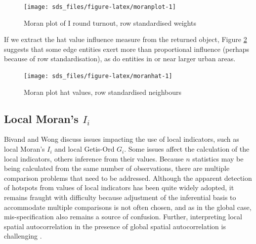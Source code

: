 \documentclass[]{book}
\newenvironment{Shaded}{\begin{snugshade}}{\end{snugshade}}
\newcommand{\KeywordTok}[1]{\textcolor[rgb]{0.13,0.29,0.53}{\textbf{#1}}}
\newcommand{\NormalTok}[1]{#1}
\newcommand{\OperatorTok}[1]{\textcolor[rgb]{0.81,0.36,0.00}{\textbf{#1}}}
\newcommand{\StringTok}[1]{\textcolor[rgb]{0.31,0.60,0.02}{#1}}
\begin{document}
\begin{figure}

{\centering \texttt{[image: sds\_files/figure-latex/moranplot-1]} 

}

\caption{Moran plot of I round turnout, row standardised weights}\label{fig:moranplot}
\end{figure}

If we extract the hat value influence measure from the returned object, Figure \ref{fig:moranhat} suggests that some edge entities exert more than proportional influence (perhaps because of row standardisation), as do entities in or near larger urban areas.



\begin{Shaded}
\end{Shaded}

\begin{figure}

{\centering \texttt{[image: sds\_files/figure-latex/moranhat-1]} 

}

\caption{Moran plot hat values, row standardised neighbours}\label{fig:moranhat}
\end{figure}

\hypertarget{local-morans-i_i}{%
\subsection{\texorpdfstring{Local Moran's \(I_i\)}{Local Moran's I\_i}}\label{local-morans-i_i}}

Bivand and Wong \citeyearpar{Bivand2018} discuss issues impacting the use of local indicators, such as local Moran's \(I_i\) and local Getis-Ord \(G_i\). Some issues affect the calculation of the local indicators, others inference from their values. Because \(n\) statistics may be being calculated from the same number of observations, there are multiple comparison problems that need to be addressed. Although the apparent detection of hotspots from values of local indicators has been quite widely adopted, it remains fraught with difficulty because adjustment of the inferential basis to accommodate multiple comparisons is not often chosen, and as in the global case, mis-specification also remains a source of confusion. Further, interpreting local spatial autocorrelation in the presence of global spatial autocorrelation is challenging \citep{ord+getis:01, tiefelsdorf:02, bivandetal:09}.
\end{document}
